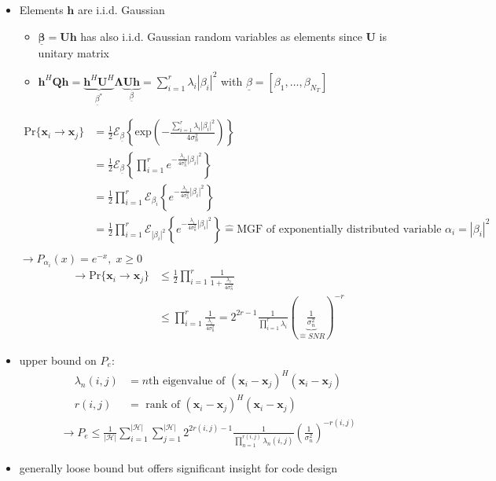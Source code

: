 \documentclass[a4paper, 10pt]{article}
\begin{document}
\begin{itemize}
	\item Elements $\mathbf{h}$ are i.i.d. Gaussian
	\begin{itemize}	
		\item $\mathbf{\underline{\beta}=Uh}$ has also i.i.d. Gaussian random variables as elements since $\mathbf{U}$ is unitary matrix
		\item $\mathbf{h}^H\mathbf{Qh}=\underbrace{\mathbf{h}^H\mathbf{U}^H}_{\underline{\beta}^*}\mathbf{\Lambda}\underbrace{\mathbf{Uh}}_{\underline{\beta}}=\sum\limits_{i=1}^r\lambda_i|\beta_i|^2$ 
		with $\underline{\beta}=[\beta_1,\dots,\beta_{N_T}]$
	\end{itemize}
	\begin{align*}
	\mathrm{Pr}\{\mathbf{x}_i\rightarrow\mathbf{x}_j\}&=\frac{1}{2}\mathcal{E}_{\underline{\beta}}\left\{\mathrm{exp}\left(-\frac{\sum\limits_{i=1}^r\lambda_i|\beta_i|^2}{4\sigma_n^2}\right)\right\}\\
	&=\frac{1}{2}\mathcal{E}_{\underline{\beta}}\left\{\prod\limits_{i=1}^r e^{-\frac{\lambda_i}{4\sigma_n^2}|\beta_i|^2}\right\}\\
	&=\frac{1}{2}\prod\limits_{i=1}^r\mathcal{E}_{\beta_i}\left\{e^{-\frac{\lambda_i}{4\sigma_n^2}|\beta_i|^2}\right\}\\
	&=\frac{1}{2}\prod\limits_{i=1}^r \mathcal{E}_{|\beta_i|^2}\left\{e^{-\frac{\lambda_i}{4\sigma_n^2}|\beta_i|^2}\right\}\hat{=}\text{MGF of exponentially distributed variable } \alpha_i=|\beta_i|^2\\
	\end{align*}
	$\rightarrow P_{\alpha_i}(x)=e^{-x},\; x\geq 0$
	\begin{align*}
	\rightarrow \mathrm{Pr}\{\mathbf{x}_i\rightarrow \mathbf{x}_j\}&\leq \frac{1}{2}\prod\limits^r_{i=1}\frac{1}{1+\frac{\lambda_i}{4\sigma_n^2}}\\
	&\leq\prod\limits^r_{i=1}\frac{1}{\frac{\lambda_i}{4\sigma_n^2}}=2^{2r-1}\frac{1}{\prod\limits^r_{i=1}\lambda_i}\left(\underbrace{\frac{1}{\sigma_n^2}}_{\hat{=}SNR}\right)^{-r}
	\end{align*}
	\item upper bound on $P_e$: 
	\begin{align*}
		\lambda_n(i,j) &= n\text{th eigenvalue of }(\mathbf{x}_i-\mathbf{x}_j)^H(\mathbf{x}_i-\mathbf{x}_j)\\
		r(i,j) &= \text{ rank of }(\mathbf{x}_i-\mathbf{x}_j)^H(\mathbf{x}_i-\mathbf{x}_j)
	\end{align*}
	\begin{align*}
	\rightarrow P_e \leq \frac{1}{\mathscr{|H|}} \sum\limits_{i=1}^{\mathscr{|H|}}\sum\limits_{j=1}^{\mathscr{|H|}}2^{2r(i,j)-1}\frac{1}{\prod\limits_{n=1}^{r(i,j)}\lambda_n(i,j)}\left(\frac{1}{\sigma_n^2}\right)^{-r(i,j)}
	\end{align*}
	\item generally loose bound but offers significant insight for code design
\end{itemize}
\end{document}
